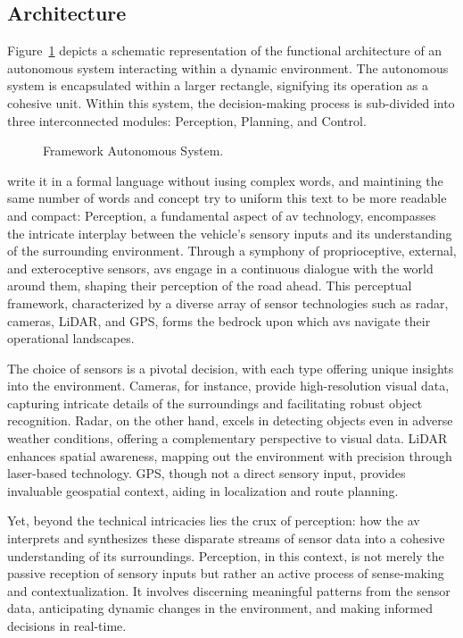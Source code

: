 \subsection{Architecture}


Figure~\ref{fig:as_arch} depicts a schematic representation of the functional architecture of an autonomous system interacting within a dynamic environment. The autonomous system is encapsulated within a larger rectangle, signifying its operation as a cohesive unit. Within this system, the decision-making process is sub-divided into three interconnected modules: Perception, Planning, and Control.

\begin{figure}[h]
	\centering
	
	\caption{Framework Autonomous System.}
	\label{fig:as_arch}
\end{figure}



 write it in a formal language without iusing complex words, and maintining the same number of words and concept try to uniform this text to be more readable and compact:
Perception, a fundamental aspect of \gls{av} technology, encompasses the intricate interplay between the vehicle's sensory inputs and its understanding of the surrounding environment. Through a symphony of proprioceptive, external, and exteroceptive sensors, \glspl{av} engage in a continuous dialogue with the world around them, shaping their perception of the road ahead. This perceptual framework, characterized by a diverse array of sensor technologies such as radar, cameras, LiDAR, and GPS, forms the bedrock upon which \glspl{av} navigate their operational landscapes.

The choice of sensors is a pivotal decision, with each type offering unique insights into the environment. Cameras, for instance, provide high-resolution visual data, capturing intricate details of the surroundings and facilitating robust object recognition. Radar, on the other hand, excels in detecting objects even in adverse weather conditions, offering a complementary perspective to visual data. LiDAR enhances spatial awareness, mapping out the environment with precision through laser-based technology. GPS, though not a direct sensory input, provides invaluable geospatial context, aiding in localization and route planning.

Yet, beyond the technical intricacies lies the crux of perception: how the \gls{av} interprets and synthesizes these disparate streams of sensor data into a cohesive understanding of its surroundings. Perception, in this context, is not merely the passive reception of sensory inputs but rather an active process of sense-making and contextualization. It involves discerning meaningful patterns from the sensor data, anticipating dynamic changes in the environment, and making informed decisions in real-time.


